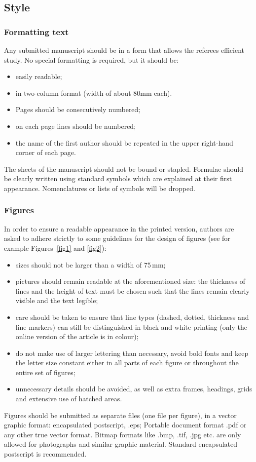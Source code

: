 \documentclass[twocolumn]{article}
\begin{document}
\subsection{Style} \label{style}

\subsubsection{Formatting text}

Any submitted manuscript should be in a form that allows the referees
efficient study. No special formatting is required, but it should be:
\begin{itemize}
\item  easily readable;
\item  in two-column format (width of about 80mm each).
\item  Pages should be consecutively numbered;
\item  on each page lines should be numbered;
\item  the name of the first author should be repeated in the upper
       right-hand corner of each page.
\end{itemize}
The sheets of the manuscript should not be bound or stapled. Formulae
should be clearly written using standard symbols which are explained
at their first appearance. Nomenclatures or lists of symbols will
be dropped.

\subsubsection{Figures}

In order to ensure a readable appearance in the printed version, authors
are asked to adhere strictly to some guidelines for the design of
figures (see for example Figures~\ref{fig1} and \ref{fig2}):
\begin{itemize}
\item sizes should not be larger than a width of 75\,mm;
\item pictures should remain readable at the aforementioned size: the
      thickness of lines and the height of text must be chosen such that
      the lines remain clearly visible and the text legible;
\item care should be taken to ensure that line types (dashed, dotted,
      thickness and line markers) can still be distinguished in black
      and white printing (only the online version of the article is in
      colour);
\item do not make use of larger lettering than necessary, avoid bold
      fonts and keep the letter size constant either in all parts of
      each figure or throughout the entire set of figures;
\item unnecessary details should be avoided, as well as extra frames,
      headings, grids and extensive use of hatched areas.
\end{itemize}
Figures should be submitted as separate files (one file per figure), in
a vector graphic format: encapsulated postscript, .eps; Portable
document format .pdf or any other true vector format. Bitmap formats
like .bmp, .tif, .jpg etc. are only allowed for photographs and similar
graphic material. Standard encapsulated postscript is recommended.
\end{document}
